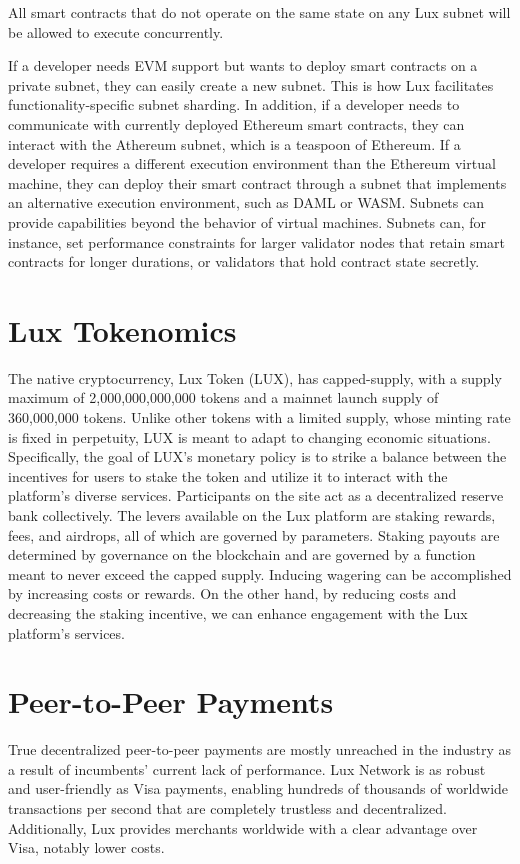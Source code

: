 \documentclass[11pt]{article}
\begin{document}
All smart contracts that do not operate on the same state on any Lux subnet will be allowed to execute concurrently.


If a developer needs EVM support but wants to deploy smart contracts on a private subnet, they can easily create a new subnet. This is how Lux facilitates functionality-specific subnet sharding. In addition, if a developer needs to communicate with currently deployed Ethereum smart contracts, they can interact with the Athereum subnet, which is a teaspoon of Ethereum. If a developer requires a different execution environment than the Ethereum virtual machine, they can deploy their smart contract through a subnet that implements an alternative execution environment, such as DAML or WASM. Subnets can provide capabilities beyond the behavior of virtual machines. Subnets can, for instance, set performance constraints for larger validator nodes that retain smart contracts for longer durations, or validators that hold contract state secretly.


\section{Lux Tokenomics}

The native cryptocurrency, Lux Token (LUX), has capped-supply, with a supply maximum of 2,000,000,000,000 tokens and a mainnet launch supply of 360,000,000 tokens. Unlike other tokens with a limited supply, whose minting rate is fixed in perpetuity, LUX is meant to adapt to changing economic situations. Specifically, the goal of LUX's monetary policy is to strike a balance between the incentives for users to stake the token and utilize it to interact with the platform's diverse services. Participants on the site act as a decentralized reserve bank collectively. The levers available on the Lux platform are staking rewards, fees, and airdrops, all of which are governed by parameters. Staking payouts are determined by governance on the blockchain and are governed by a function meant to never exceed the capped supply. Inducing wagering can be accomplished by increasing costs or rewards. On the other hand, by reducing costs and decreasing the staking incentive, we can enhance engagement with the Lux platform's services.


\section{Peer-to-Peer Payments}

True decentralized peer-to-peer payments are mostly unreached in the industry as a result of incumbents' current lack of performance. Lux Network is as robust and user-friendly as Visa payments, enabling hundreds of thousands of worldwide transactions per second that are completely trustless and decentralized. Additionally, Lux provides merchants worldwide with a clear advantage over Visa, notably lower costs.
\end{document}
